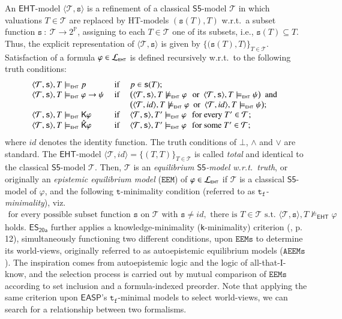 \documentclass[submission,copyright,creativecommons]{eptcs}
\renewcommand{\phi}  { \varphi }
\newcommand{\lang}[1]  { {\cal L}_{#1} }
\newcommand{\tuple}[1]  { \langle #1 \rangle }
\newcommand{\Prop}  { \mathbb{P} }
\newcommand{\suchthat}  { \ : \ }
\newcommand{\set}[1]  { \{ #1 \} }
\newcommand{\logic}[1]  { \ensuremath{\mathsf{#1}} }
\newcommand{\sfive}  { \logic{S5} }
\newcommand{\EHT}  { \logic{EHT} }
\newcommand{\EASP}  { \logic{EASP} }
\newcommand{\intimp}  { \rightarrow }
\newcommand{\K}  { \mathsf{K} }
\newcommand{\Khat}  { \hat{\mathsf{K}} }
\newcommand{\ESyirmia}  { \logic{ES_{\scriptscriptstyle{20a}} } }
\newcommand{\there}  { \mathcal{T} }
\newcommand{\weak}  { \texttt{s} }
\newcommand{\functional}  { \texttt{f} }
\newcommand{\tfunctional}  { \texttt{t}_{\!\functional} }
\newcommand{\EEM} { \texttt{EEM} }
\newcommand{\EEMs}  { \texttt{EEMs} }
\newcommand{\AEEMs}  { \texttt{AEEMs} }
\newcommand{\Ehtmodels}  { \models_{\scriptscriptstyle \EHT} }
\newcommand{\notEhtmodels}  { \not\models_{\scriptscriptstyle \EHT} }
\begin{document}
An $\EHT$-model $\tuple{\there, \weak}$ is a refinement of 
a classical $\sfive$-model $\there$
in which valuations $T \in \there$ are replaced by HT-models $(\weak(T), T)$ w.r.t.\ a
subset function $\weak {\suchthat} \there \rightarrow 2^{\Prop}$,
assigning to each $T \in \there$ one of its subsets, i.e., $\weak(T)\subseteq T$. 
Thus, the explicit representation of $\tuple{\there, \weak}$
is given by $\big\{\big(\weak(T),T\big)\big\}_{\scriptscriptstyle{T \in \there}}$.
%
Satisfaction of a formula $\phi \in \lang{\scriptscriptstyle{\EHT}}$ is defined recursively
w.r.t.\ to the following truth conditions:
%
$$\begin{array}{lll}
\tuple{\there, \weak},T \Ehtmodels p   & \text{ if } &  p \in \weak(T);
\\
\tuple{\there, \weak},T \Ehtmodels \phi \intimp \psi   & \text{ if } &
\big ( \tuple{\there, \weak},T \notEhtmodels \phi \text{ \, or \ } \tuple{\there, \weak},T  \Ehtmodels \psi \big )
\text{ \ and }
\\
 &&
\big ( \tuple{\there, id},T  \notEhtmodels \phi  \text{ \ or \ }  \tuple{\there, id},T  \Ehtmodels \psi \big );
\\
\tuple{\there, \weak},T \Ehtmodels \K \phi & \text{ if } &
\tuple{\there, \weak},T' \Ehtmodels \phi \text{ \, for every } T' \in \there;
\\
\tuple{\there, \weak},T \Ehtmodels \Khat \phi  & \text{ if } &
\tuple{\there, \weak},T' \Ehtmodels \phi \text{ \, for some } T' \in \there;
\end{array}$$
%
where $id$ denotes the identity function.
The truth conditions of $\bot$, $\land$ and $\lor$ are standard. The $\EHT$-model
$\tuple{\mathcal T,id} =\set{(T,T)}_{\scriptscriptstyle{T\in\mathcal T}}$ is called \emph{total} and identical to the classical $\sfive$-model $\mathcal T$.
%
Then, $\mathcal T$ is an \emph{equilibrium $\sfive$-model w.r.t.\ truth}, 
or originally
an \emph{epistemic equilibrium model} ($\EEM$)
of  $\phi \in \lang{\scriptscriptstyle{\EHT}}$
if $\mathcal T$ is a classical $\sfive$-model of $\phi$, 
and the following $\texttt{t}$-minimality condition
(referred to as \emph{$\tfunctional$-minimality}), viz.\ 
\begin{align} \label{truth minimality 1}
\text{for every possible subset function } \weak \text{ on } \mathcal T \text{ with }
\weak \neq id,
\text{ there is } T \in \mathcal T \text{ s.t.\ } 
\tuple{\there, \weak}, T \notEhtmodels \phi 
\end{align}
%
holds. $\ESyirmia$ further applies a knowledge-minimality
(\texttt{k}-minimality) criterion (\cite{SuAI20}, p.\,12), 
simultaneously functioning two different conditions, 
upon $\EEMs$ to determine its world-views, originally referred to as 
autoepistemic equilibrium models ($\AEEMs$). The inspiration comes from
autoepistemic logic and the logic of all-that-I-know, and the selection
process is carried out by mutual comparison of $\EEMs$
according to set inclusion and a formula-indexed
preorder. Note that applying the same criterion upon 
$\EASP$'s $\tfunctional$-minimal models to select world-views, we can
search for a relationship between two formalisms. 
\end{document}
